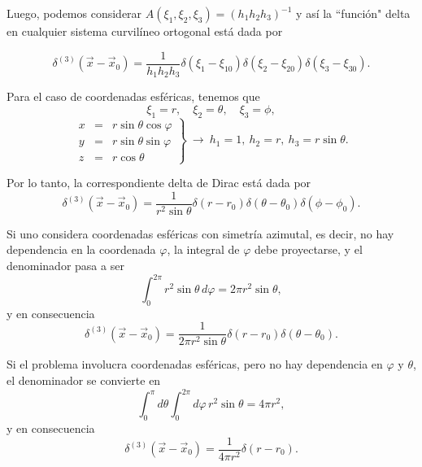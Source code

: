 Luego, podemos considerar $A(\xi_1, \xi_2, \xi_3) = (h_1 h_2 h_3)^{-1}$ y así la ``función" delta en cualquier sistema curvilíneo ortogonal está dada por 
\begin{shaded}
    \begin{equation}
       \delta^{(3)}(\Vec{x} - \Vec{x}_0) = \frac{1}{h_1h_2h_3} \delta(\xi_1 - \xi_{10})\delta(\xi_2 - \xi_{20})\delta(\xi_3 - \xi_{30}). 
    \end{equation}
\end{shaded}

\begin{ejemplo}
Para el caso de coordenadas esféricas, tenemos que 
\begin{equation}
 \xi_1 = r, \quad \xi_2 = \theta, \quad \xi_3 = \phi,   
\end{equation}
\begin{equation*}
   \left. \begin{array}{cll}
         x &=& r \sin \theta \cos \varphi \\
    y &=& r \sin \theta \sin \varphi \\
    z&=& r \cos \theta  
    \end{array} \right\}  ~\longrightarrow~ h_1 = 1, ~ h_2 = r, ~ h_3 = r \sin \theta.
\end{equation*}

Por lo tanto, la correspondiente delta de Dirac está dada por
\begin{equation}
 \delta^{(3)}(\Vec{x} - \Vec{x}_0) = \frac{1}{r^2 \sin \theta} \delta(r-r_0)\delta(\theta - \theta_0)\delta(\phi - \phi_0).   
\end{equation}

Si uno considera coordenadas esféricas con simetría azimutal, es decir, no hay dependencia en la coordenada $\varphi$, la integral de $\varphi$ debe proyectarse, y el denominador pasa a ser
\begin{equation}
    \int_0^{2\pi} r^2\sin\theta \,d\varphi = 2\pi r^2 \sin\theta,
\end{equation}
y en consecuencia
\begin{equation}
    \delta^{(3)}(\Vec{x} - \Vec{x}_0) = \frac{1}{2\pi r^2\sin\theta} \delta(r-r_0)\delta(\theta - \theta_0).
\end{equation}

Si el problema involucra coordenadas esféricas, pero no hay dependencia en $\varphi$ y $\theta$, el denominador se convierte en
\begin{equation}
    \int_{0}^{\pi} d\theta \int_0^{2\pi} d\varphi\, r^2\sin\theta  = 4\pi r^2,
\end{equation}
y en consecuencia
\begin{equation}
    \delta^{(3)}(\Vec{x} - \Vec{x}_0) = \frac{1}{4\pi r^2} \delta(r-r_0).
\end{equation}
\end{ejemplo}

